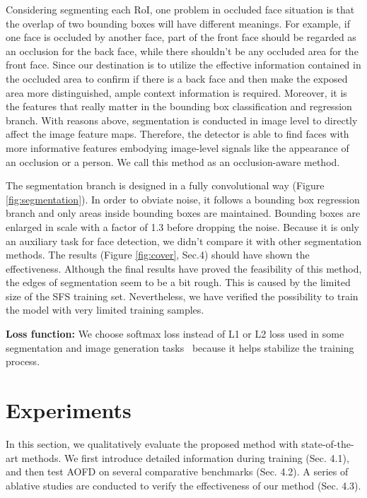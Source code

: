 \documentclass[10pt,twocolumn,letterpaper]{article}
\begin{document}
Considering segmenting each RoI, one problem in occluded face situation is that the overlap of two bounding boxes will have different meanings. For example, if one face is occluded by another face, part of the front face should be regarded as an occlusion for the back face, while there shouldn't be any occluded area for the front face. Since our destination is to utilize the effective information contained in the occluded area to confirm if there is a back face and then make the exposed area more distinguished, ample context information is required. Moreover, it is the features that really matter in the bounding box classification and regression branch. With reasons above, segmentation is conducted in image level to directly affect the image feature maps. Therefore, the detector is able to find faces with more informative features embodying image-level signals like the appearance of an occlusion or a person. We call this method as an occlusion-aware method.

The segmentation branch is designed in a fully convolutional way (Figure \ref{fig:segmentation}). In order to obviate noise, it follows a bounding box regression branch and only areas inside bounding boxes are maintained. Bounding boxes are enlarged in scale with a factor of 1.3 before dropping the noise. Because it is only an auxiliary task for face detection, we didn't compare it with other segmentation methods. The results (Figure \ref{fig:cover}, Sec.4) should have shown the effectiveness. Although the final results have proved the feasibility of this method, the edges of segmentation seem to be a bit rough. This is caused by the limited size of the SFS training set. Nevertheless, we have verified the possibility to train the model with very limited training samples.

\textbf{Loss function:} We choose softmax loss instead of L1 or L2 loss used in some segmentation and image generation tasks~\cite{huang2017beyond,li2017perceptual} because it helps stabilize the training process.








\section{Experiments}
In this section, we qualitatively evaluate the proposed method with state-of-the-art methods. We first introduce detailed information during training (Sec. 4.1), and then test AOFD on several comparative benchmarks (Sec. 4.2). A series of ablative studies are conducted to verify the effectiveness of our method (Sec. 4.3). 
\end{document}
